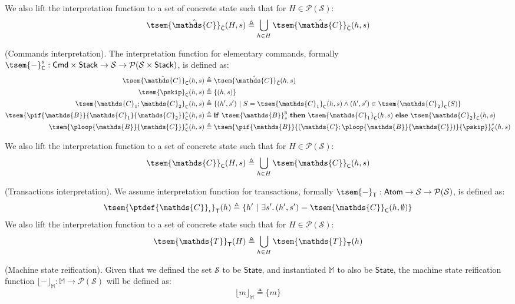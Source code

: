 We also lift the interpretation function to a set of concrete state such that for $H \in \mathcal{P}(\mathcal{S})$:
\[
	\tsem{\hat{\mathds{C}}}_{\hat{\mathsf{C}}}(H, s) \triangleq \bigcup_{h \in H} \tsem{\hat{\mathds{C}}}_{\hat{\mathsf{C}}}(h, s)
\]	

\param (Commands interpretation). The interpretation function for elementary commands, formally $\tsem{-}^s_{\mathsf{C}} : \mathsf{Cmd} \times \mathsf{Stack} \rightarrow \mathcal{S} \rightarrow \mathcal{P}(\mathcal{S} \times \mathsf{Stack})$, is defined as:
\begin{align*}
	\tsem{\hat{\mathds{C}}}_{\mathsf{C}}(h, s) &\triangleq \tsem{\hat{\mathds{C}}}_{\hat{\mathsf{C}}}(h, s)
	\\
	\tsem{\pskip}_{\mathsf{C}}(h, s) &\triangleq \{(h, s)\}
	\\
	\tsem{\mathds{C}_1 ; \mathds{C}_2}_{\mathsf{C}}(h, s) &\triangleq \{ (h', s')\ |\ S = \tsem{\mathds{C}_1}_\mathsf{C}(h, s) \land (h', s') \in \tsem{\mathds{C}_2}_\mathsf{C}(S) \}
	\\
	\tsem{\pif{\mathds{B}}{\mathds{C}_1}{\mathds{C}_2}}^s_\mathsf{C}(h, s) &\triangleq \mathbf{if}\ \tsem{\mathds{B}}^\textsc{b}_s\ \mathbf{then}\ \tsem{\mathds{C}_1}_\mathsf{C}(h, s)\ \mathbf{else}\ \tsem{\mathds{C}_2}_\mathsf{C}(h, s)
	\\
	\tsem{\ploop{\mathds{B}}{\mathds{C}}}^s_\mathsf{C}(h, s) &\triangleq \tsem{\pif{\mathds{B}}{\left(\mathds{C};\ploop{\mathds{B}}{\mathds{C}}\right)}{\pskip}}_\mathsf{C}^s(h, s)
\end{align*}

We also lift the interpretation function to a set of concrete state such that for $H \in \mathcal{P}(\mathcal{S})$:
\[
	\tsem{\mathds{C}}_\mathsf{C}(H, s) \triangleq \bigcup_{h \in H}  \tsem{\mathds{C}}_\mathsf{C}(h, s)
\]	

\param (Transactions interpretation). We assume interpretation function for transactions, formally $\tsem{-}_\mathsf{T} : \mathsf{Atom} \rightarrow \mathcal{S} \rightarrow \mathcal{P}(\mathcal{S})$, is defined as:
\[
	\tsem{\ptdef{\mathds{C}}_\iota}_\mathsf{T}(h) \triangleq \{ h'\ |\ \exists s' \ldotp (h', s') = \tsem{\mathds{C}}_\mathsf{C}(h, \emptyset) \}
\]
We also lift the interpretation function to a set of concrete state such that for $H \in \mathcal{P}(\mathcal{S})$:
\[
	\tsem{\mathds{T}}_\mathsf{T}(H) \triangleq \bigcup_{h \in H}  \tsem{\mathds{T}}_\mathsf{T}(h)
\]	

\param (Machine state reification). Given that we defined the set $\mathcal{S}$ to be $\mathsf{State}$, and instantiated $\mathbb{M}$ to also be $\mathsf{State}$, the machine state reification function $\lfloor - \rfloor_\mathbb{M} : \mathbb{M} \rightarrow \mathcal{P}(\mathcal{S})$ will be defined as:
\[
	\lfloor m \rfloor_\mathbb{M} \triangleq \{ m \}
\]

